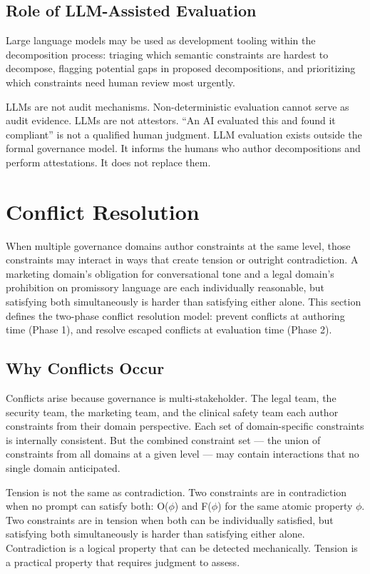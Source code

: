 \subsection{Role of LLM-Assisted Evaluation}


Large language models may be used as development tooling within the decomposition process: triaging which semantic constraints are hardest to decompose, flagging potential gaps in proposed decompositions, and prioritizing which constraints need human review most urgently.

LLMs are not audit mechanisms. Non-deterministic evaluation cannot serve as audit evidence. LLMs are not attestors. ``An AI evaluated this and found it compliant'' is not a qualified human judgment. LLM evaluation exists outside the formal governance model. It informs the humans who author decompositions and perform attestations. It does not replace them.



\section{Conflict Resolution}
\label{sec:prompt-6}


When multiple governance domains author constraints at the same level, those constraints may interact in ways that create tension or outright contradiction. A marketing domain's obligation for conversational tone and a legal domain's prohibition on promissory language are each individually reasonable, but satisfying both simultaneously is harder than satisfying either alone. This section defines the two-phase conflict resolution model: prevent conflicts at authoring time (Phase 1), and resolve escaped conflicts at evaluation time (Phase 2).

\subsection{Why Conflicts Occur}


Conflicts arise because governance is multi-stakeholder. The legal team, the security team, the marketing team, and the clinical safety team each author constraints from their domain perspective. Each set of domain-specific constraints is internally consistent. But the combined constraint set --- the union of constraints from all domains at a given level --- may contain interactions that no single domain anticipated.

Tension is not the same as contradiction. Two constraints are in contradiction when no prompt can satisfy both: O($\phi$) and F($\phi$) for the same atomic property $\phi$. Two constraints are in tension when both can be individually satisfied, but satisfying both simultaneously is harder than satisfying either alone. Contradiction is a logical property that can be detected mechanically. Tension is a practical property that requires judgment to assess.

